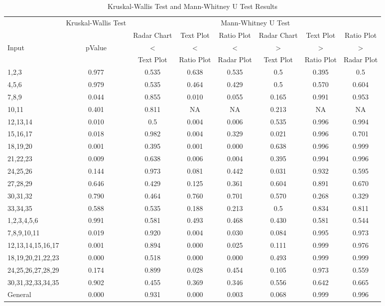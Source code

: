 \begin{table}[ht]
\centering
\begin{adjustbox}{width=1\textwidth}
\small
\begin{tabular}{@{\extracolsep{4pt}}lccccccc}
\toprule   
{} & {Kruskal-Wallis Test} & \multicolumn{6}{c}{Mann-Whitney U Test}\\
 \cmidrule{2-2} 
 \cmidrule{3-8} 
   &  & Radar Chart  & Text Plot  & Ratio Plot  & Radar Chart  & Text Plot  & Ratio Plot \\ 
Input  & pValue & <  & <  & < & > & > & > \\
   &  & Text Plot & Ratio Plot & Radar Plot & Text Plot & Ratio Plot & Radar Plot\\
\midrule
1,2,3 & 0.977 & 0.535 & 0.638 & 0.535 & 0.5 & 0.395 & 0.5\\ 
4,5,6 & 0.979 & 0.535 & 0.464 & 0.429 & 0.5 & 0.570 & 0.604\\ 
7,8,9 & 0.044 &  0.855 & 0.010 & 0.055 & 0.165 & 0.991 & 0.953 \\ 
10,11 & 0.401 & 0.811 & NA & NA & 0.213 & NA & NA\\ 
12,13,14 & 0.010 & 0.5 & 0.004 & 0.006 & 0.535 & 0.996 & 0.994 \\ 
15,16,17& 0.018 & 0.982  & 0.004 & 0.329 & 0.021 & 0.996 & 0.701\\ 
18,19,20 & 0.001 & 0.395 & 0.001 & 0.000 & 0.638 & 0.996 & 0.999 \\ 
21,22,23 & 0.009 & 0.638 & 0.006 & 0.004 & 0.395 & 0.994 & 0.996 \\ 
24,25,26 & 0.144 & 0.973 & 0.081 & 0.442 & 0.031 & 0.932 & 0.595\\ 
27,28,29 & 0.646 & 0.429 & 0.125 & 0.361 & 0.604 & 0.891 & 0.670\\ 
30,31,32 & 0.790 & 0.464 & 0.760 & 0.701 & 0.570 & 0.268 & 0.329\\ 
33,34,35 & 0.588 & 0.535 & 0.188 & 0.213 & 0.5 & 0.834 & 0.811\\ 
 \midrule
1,2,3,4,5,6 & 0.991 & 0.581 & 0.493 & 0.468 & 0.430 & 0.581 & 0.544\\ 
7,8,9,10,11 & 0.019 & 0.920 & 0.004 & 0.030 & 0.084 & 0.995 & 0.973\\ 
12,13,14,15,16,17 & 0.001 & 0.894 & 0.000 & 0.025 & 0.111 & 0.999 & 0.976\\
18,19,20,21,22,23 & 0.000 & 0.518 & 0.000 & 0.000 & 0.493 & 0.999 & 0.999\\
24,25,26,27,28,29 & 0.174 & 0.899 & 0.028 & 0.454 & 0.105 & 0.973 & 0.559\\
30,31,32,33,34,35 & 0.902 & 0.455 & 0.369 & 0.346 & 0.556 & 0.642 & 0.665\\
 \midrule
 General & 0.000 & 0.931 & 0.000 & 0.003 & 0.068 & 0.999 & 0.996\\
\bottomrule
\end{tabular}
\end{adjustbox}
\caption{Kruskal-Wallis Test and Mann-Whitney U Test Results} 
\end{table}

